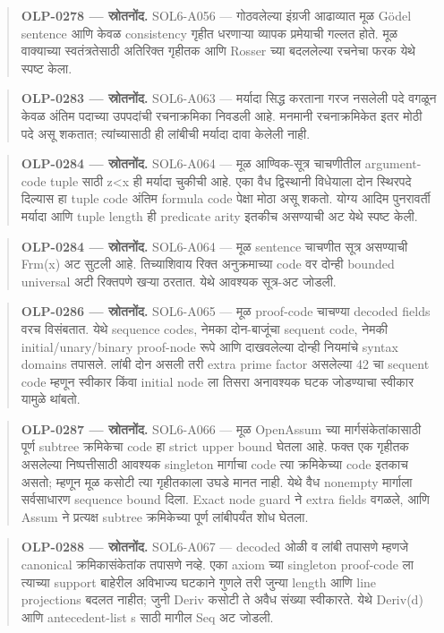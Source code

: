 \begin{quote}\small\textbf{OLP-0278 — स्रोतनोंद.} SOL6-A056 — गोठवलेल्या इंग्रजी आढाव्यात मूळ Gödel sentence आणि केवळ consistency गृहीत धरणाऱ्या व्यापक प्रमेयाची गल्लत होते. मूळ वाक्याच्या स्वतंत्रतेसाठी अतिरिक्त गृहीतक आणि Rosser च्या बदललेल्या रचनेचा फरक येथे स्पष्ट केला.\end{quote}
\begin{quote}\small\textbf{OLP-0283 — स्रोतनोंद.} SOL6-A063 — मर्यादा सिद्ध करताना गरज नसलेली पदे वगळून केवळ अंतिम पदाच्या उपपदांची रचनाक्रमिका निवडली आहे. मनमानी रचनाक्रमिकेत इतर मोठी पदे असू शकतात; त्यांच्यासाठी ही लांबीची मर्यादा दावा केलेली नाही.\end{quote}
\begin{quote}\small\textbf{OLP-0284 — स्रोतनोंद.} SOL6-A064 — मूळ आण्विक-सूत्र चाचणीतील argument-code tuple साठी z<x ही मर्यादा चुकीची आहे. एका वैध द्विस्थानी विधेयाला दोन स्थिरपदे दिल्यास हा tuple code अंतिम formula code पेक्षा मोठा असू शकतो. योग्य आदिम पुनरावर्ती मर्यादा आणि tuple length ही predicate arity इतकीच असण्याची अट येथे स्पष्ट केली.\end{quote}
\begin{quote}\small\textbf{OLP-0284 — स्रोतनोंद.} SOL6-A064 — मूळ sentence चाचणीत सूत्र असण्याची Frm(x) अट सुटली आहे. तिच्याशिवाय रिक्त अनुक्रमाच्या code वर दोन्ही bounded universal अटी रिक्तपणे खऱ्या ठरतात. येथे आवश्यक सूत्र-अट जोडली.\end{quote}
\begin{quote}\small\textbf{OLP-0286 — स्रोतनोंद.} SOL6-A065 — मूळ proof-code चाचण्या decoded fields वरच विसंबतात. येथे sequence codes, नेमका दोन-बाजूंचा sequent code, नेमकी initial/unary/binary proof-node रूपे आणि दाखवलेल्या दोन्ही नियमांचे syntax domains तपासले. लांबी दोन असली तरी extra prime factor असलेल्या 42 चा sequent code म्हणून स्वीकार किंवा initial node ला तिसरा अनावश्यक घटक जोडण्याचा स्वीकार यामुळे थांबतो.\end{quote}
\begin{quote}\small\textbf{OLP-0287 — स्रोतनोंद.} SOL6-A066 — मूळ OpenAssum च्या मार्गसंकेतांकासाठी पूर्ण subtree क्रमिकेचा code हा strict upper bound घेतला आहे. फक्त एक गृहीतक असलेल्या निष्पत्तीसाठी आवश्यक singleton मार्गाचा code त्या क्रमिकेच्या code इतकाच असतो; म्हणून मूळ कसोटी त्या गृहीतकाला उघडे मानत नाही. येथे वैध nonempty मार्गाला सर्वसाधारण sequence bound दिला. Exact node guard ने extra fields वगळले, आणि Assum ने प्रत्यक्ष subtree क्रमिकेच्या पूर्ण लांबीपर्यंत शोध घेतला.\end{quote}
\begin{quote}\small\textbf{OLP-0288 — स्रोतनोंद.} SOL6-A067 — decoded ओळी व लांबी तपासणे म्हणजे canonical क्रमिकासंकेतांक तपासणे नव्हे. एका axiom च्या singleton proof-code ला त्याच्या support बाहेरील अविभाज्य घटकाने गुणले तरी जुन्या length आणि line projections बदलत नाहीत; जुनी Deriv कसोटी ते अवैध संख्या स्वीकारते. येथे Deriv(d) आणि antecedent-list s साठी मागील Seq अट जोडली.\end{quote}
